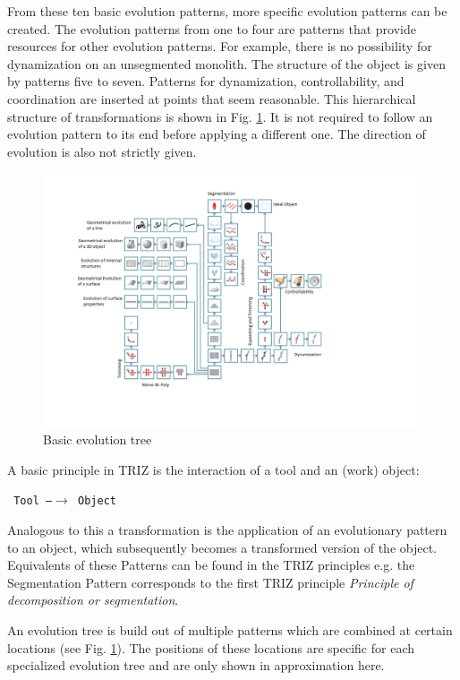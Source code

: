 \documentclass[11pt,a4paper]{article}
\begin{document}
From these ten basic evolution patterns, more specific evolution patterns can
be created. The evolution patterns from one to four are patterns that provide
resources for other evolution patterns. For example, there is no possibility
for dynamization on an unsegmented monolith. The structure of the object is
given by patterns five to seven. Patterns for dynamization, controllability,
and coordination are inserted at points that seem reasonable. This
hierarchical structure of transformations is shown in
Fig. \ref{fig:basic_evo}. It is not required to follow an evolution pattern to
its end before applying a different one. The direction of evolution is also
not strictly given. 

\begin{figure}[htb]
  \centering
  \includegraphics[width=\linewidth]{figures/basictree.png}
  \caption{\small Basic evolution tree \cite{Shpakovsky2016}}
  \label{fig:basic_evo}
\end{figure}

A basic principle in TRIZ is the interaction of a tool and an (work) object:

\begin{center}\tt
  Tool \textrm{---}$\to$ Object
\end{center}

Analogous to this a transformation is the application of an evolutionary
pattern to an object, which subsequently becomes a transformed version of the
object. Equivalents of these Patterns can be found in the TRIZ principles
e.g. the Segmentation Pattern corresponds to the first TRIZ principle
\textit{Principle of decomposition or segmentation}.

An evolution tree is build out of multiple patterns which are combined at
certain locations (see Fig. \ref{fig:basic_evo}). The positions of these
locations are specific for each specialized evolution tree and are only shown
in approximation here.
\end{document}
